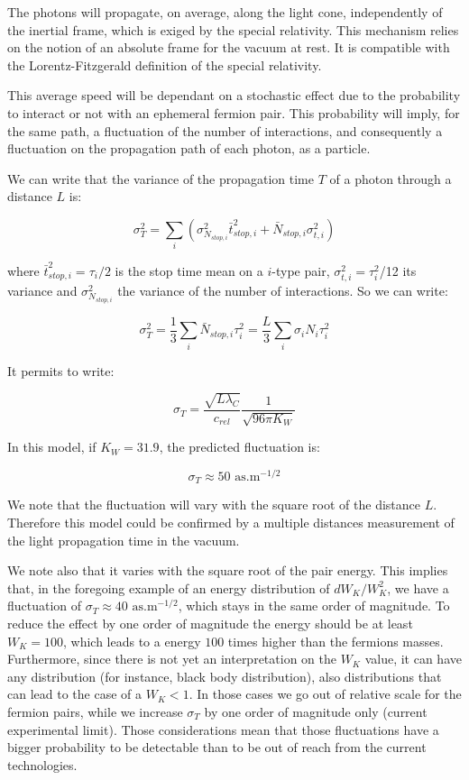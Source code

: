 \documentclass[9pt, a4, twoside]{article}
\begin{document}
The photons will propagate, on average, along the light cone, independently of the inertial frame, which is exiged by the special relativity. This mechanism relies on the notion of an absolute frame for the vacuum at rest. It is compatible with the Lorentz-Fitzgerald definition of the special relativity.

This average speed will be dependant on a stochastic effect due to the probability to interact or not with an ephemeral fermion pair. This probability will imply, for the same path, a fluctuation of the number of interactions, and consequently a fluctuation on the propagation path of each photon, as a particle.

We can write that the variance of the propagation time $T$ of a photon through a distance $L$ is:

\[\sigma_T^2=\sum_i \left(\sigma^2_{N_{stop,i}} \bar {t}^2_{stop,i}+\bar {N}_{stop,i}\sigma^2_{t,i}\right)\]

where $\bar {t}^2_{stop,i}=\tau_i/2$ is the stop time mean on a $i$-type pair, $\sigma^2_{t,i}=\tau^2_i$/12 its variance and $\sigma^2_{N_{stop,i}}$ the variance of the number of interactions. So we can write:

\[\sigma^2_T=\frac 13 \sum_i \bar {N}_{stop,i}\tau^2_i=\frac L3 \sum_i \sigma_iN_i\tau^2_i\]

It permits to write:

\[\sigma_T=\frac {\sqrt{L\lambda_{C}}} {c_{rel}} \frac {1} {\sqrt {96 \pi K_W}}\]

In this model, if $K_W=31.9$, the predicted fluctuation is:

\[\sigma_T\approx 50 \text{ as.m}^{-1/2}\]

We note that the fluctuation will vary with the square root of the distance $L$. Therefore this model could be confirmed by a multiple distances measurement of the light propagation time in the vacuum.

We note also that it varies with the square root of the pair energy. This implies that, in the foregoing example of an energy distribution of $dW_K/W_K^2$, we have a fluctuation of $\sigma_T\approx 40 \text{ as.m}^{-1/2}$, which stays in the same order of magnitude. To reduce the effect by one order of magnitude the energy should be at least $W_K=100$, which leads to a energy $100$ times higher than the fermions masses. Furthermore, since there is not yet an interpretation on the $W_K$ value, it can have any distribution (for instance, black body distribution), also distributions that can lead to the case of a $W_K<1$. In those cases we go out of relative scale for the fermion pairs, while we increase $\sigma_T$ by one order of magnitude only (current experimental limit). Those considerations mean that those fluctuations have a bigger probability to be detectable than to be out of reach from the current technologies.
\end{document}
